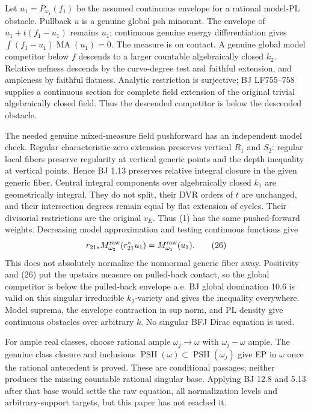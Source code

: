 \documentclass[
  11pt,
]{article}
\providecommand{\PSH}{\operatorname{PSH}}
\providecommand{\MA}{\operatorname{MA}}
\begin{document}
Let \(u_1=P_{\omega_1}(f_1)\) be the assumed continuous envelope for a
rational model-PL obstacle. Pullback \(u\) is a genuine global psh
minorant. The envelope of \(u_1+t(f_1-u_1)\) remains \(u_1\); continuous
genuine energy differentiation gives \(\int(f_1-u_1)\MA(u_1)=0\). The
measure is on contact. A genuine global model competitor below \(f\)
descends to a larger countable algebraically closed \(k_2\). Relative
nefness descends by the curve-degree test and faithful extension, and
ampleness by faithful flatness. Analytic restriction is surjective; BJ
LF755--758 supplies a continuous section for complete field extension of
the original trivial algebraically closed field. Thus the descended
competitor is below the descended obstacle.

The needed genuine mixed-measure field pushforward has an independent
model check. Regular characteristic-zero extension preserves vertical
\(R_1\) and \(S_2\): regular local fibers preserve regularity at
vertical generic points and the depth inequality at vertical points.
Hence BJ 1.13 preserves relative integral closure in the given generic
fiber. Central integral components over algebraically closed \(k_1\) are
geometrically integral. They do not split, their DVR orders of \(t\) are
unchanged, and their intersection degrees remain equal by flat extension
of cycles. Their divisorial restrictions are the original \(v_E\). Thus
(1) has the same pushed-forward weights. Decreasing model approximation
and testing continuous functions give
\[r_{21*}M_{\omega_2}^{\rm raw}(r_{21}^*u_1)
                           =M_{\omega_1}^{\rm raw}(u_1).               \tag{26}\]
This does not absolutely normalize the nonnormal generic fiber away.
Positivity and (26) put the upstairs measure on pulled-back contact, so
the global competitor is below the pulled-back envelope a.e. BJ global
domination 10.6 is valid on this singular irreducible \(k_2\)-variety
and gives the inequality everywhere. Model suprema, the envelope
contraction in sup norm, and PL density give continuous obstacles over
arbitrary \(k\). No singular BFJ Dirac equation is used.

For ample real classes, choose rational ample \(\omega_j\to\omega\) with
\(\omega_j-\omega\) ample. The genuine class closure and inclusions
\(\PSH(\omega)\subset\PSH(\omega_j)\) give EP in \(\omega\) once the
rational antecedent is proved. These are conditional passages; neither
produces the missing countable rational singular base. Applying BJ 12.8
and 5.13 after that base would settle the raw equation, all
normalization levels and arbitrary-support targets, but this paper has
not reached it.
\end{document}
